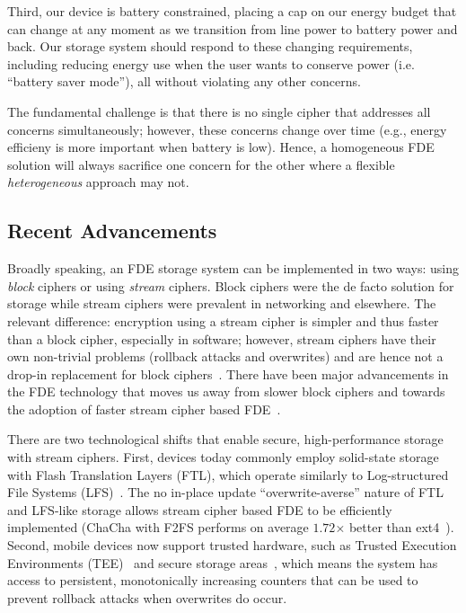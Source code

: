 Third, our device is battery constrained, placing a cap on our energy budget
that can change at any moment as we transition from line power to battery power
and back. Our storage system should respond to these changing requirements,
including reducing energy use when the user wants to conserve power (i.e.
``battery saver mode''), all without violating any other concerns.

The fundamental challenge is that there is no single cipher that
addresses all concerns simultaneously; however, these concerns change
over time (e.g., energy efficieny is more important when battery is
low).  Hence, a homogeneous FDE solution will always sacrifice one
concern for the other where a flexible {\em heterogeneous} approach
may not.


\subsection{Recent Advancements}

Broadly speaking, an FDE storage system can be implemented in two ways: using
{\em block} ciphers or using {\em stream} ciphers. Block ciphers were the de
facto solution for storage while stream ciphers were prevalent in networking and
elsewhere. The relevant difference: encryption using a stream cipher is simpler
and thus faster than a block cipher, especially in software; however, stream
ciphers have their own non-trivial problems (\ie rollback attacks and
overwrites) and are hence not a drop-in replacement for block
ciphers~\cite{StrongBox}. There have been major advancements in the FDE
technology that moves us away from slower block ciphers and towards the adoption
of faster stream cipher based FDE~\cite{Adiantum, StrongBox}.

There are two technological shifts that enable secure, high-performance storage
with stream ciphers. First, devices today commonly employ solid-state storage
with Flash Translation Layers (FTL), which operate similarly to Log-structured
File Systems (LFS)~\cite{LFS, F2FS, NILFS}. The no in-place update
``overwrite-averse'' nature of FTL and LFS-like storage allows stream cipher
based FDE to be efficiently implemented (\eg ChaCha with F2FS performs on
average $1.72$× better than ext4~\cite{StrongBox}). Second, mobile devices now
support trusted hardware, such as Trusted Execution Environments
(TEE)~\cite{TrustZone, TEE} and secure storage areas~\cite{eMMC-standard}, which
means the system has access to persistent, monotonically increasing counters
that can be used to prevent rollback attacks when overwrites do occur.


